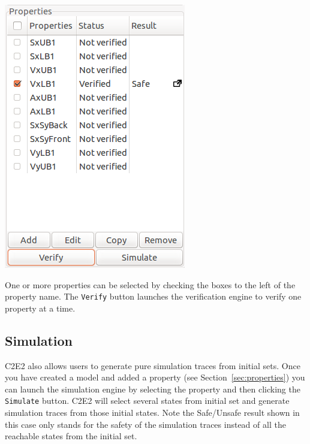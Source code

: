 \documentclass{tufte-book} %
\begin{document}
\begin{marginfigure}
 \centerline{\includegraphics[scale=.25,keepaspectratio=true]{Images/Verified.png}}
 \caption{One or more properties can be selected by checking the boxes to the left of the property name. The \texttt{Verify} button launches the verification engine to verify one property at a time.} 
 \label{fig:safe}
\end{marginfigure}


\subsection{Simulation}
C2E2 also allows users to generate pure simulation traces from initial sets. Once you have created a model and added a property (see Section~\ref{sec:properties}) you can launch the simulation engine by selecting the property and then clicking the \texttt{Simulate} button. C2E2 will select several states from initial set and generate simulation traces from those initial states. Note the Safe/Unsafe result shown in this case only stands for the safety of the simulation traces instead of all the reachable states from the initial set.
\end{document}
